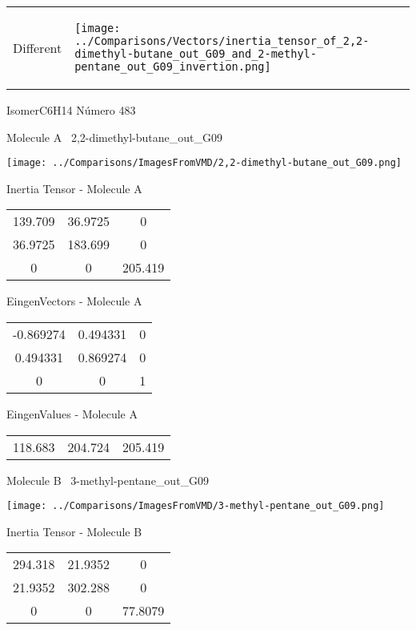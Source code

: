 \vtab[-5mm]
\begin{tabular}{*{2}{m{}}}
\begin{center}
\textcolor{NavyBlue}{\Large Different}
\end{center}
&
\begin{center}
\texttt{[image: ../Comparisons/Vectors/inertia\_tensor\_of\_2,2-dimethyl-butane\_out\_G09\_and\_2-methyl-pentane\_out\_G09\_invertion.png]}
\end{center}
\end{tabular}

 \newpage

\vtab[-3cm]
\begin{center}
{\large IsomerC6H14 \tab Número 483}
\end{center}
\begin{multicols}{2}
\begin{center}

Molecule A \
2,2-dimethyl-butane\_out\_G09

\texttt{[image: ../Comparisons/ImagesFromVMD/2,2-dimethyl-butane\_out\_G09.png]}

Inertia Tensor - Molecule A \\
\begin{tabular}{|c c c|}
139.709	 & 	36.9725	 & 	0	 \\
36.9725	 & 	183.699	 & 	0	 \\
0	 & 	0	 & 	205.419
\end{tabular}

\vtab
 EingenVectors - Molecule A     \\
\begin{tabular}{|c c c|}
-0.869274	 & 	0.494331	 & 	0	 \\
0.494331	 & 	0.869274	 & 	0	 \\
0	 & 	0	 & 	1
\end{tabular}

\vtab
 EingenValues - Molecule A     \\
\begin{tabular}{|c c c|}
118.683	 & 	204.724	 & 	205.419	 \\
\end{tabular}
\columnbreak

Molecule B \
3-methyl-pentane\_out\_G09

\texttt{[image: ../Comparisons/ImagesFromVMD/3-methyl-pentane\_out\_G09.png]}

Inertia Tensor - Molecule B \\
\begin{tabular}{|c c c|}
294.318	 & 	21.9352	 & 	0	 \\
21.9352	 & 	302.288	 & 	0	 \\
0	 & 	0	 & 	77.8079
\end{tabular}


\end{center}
\end{multicols}
